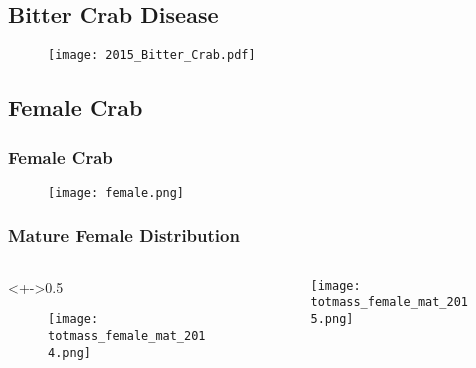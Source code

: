 \subsection{Bitter Crab Disease}

\begin{frame}

\begin{figure}

 \vspace*{-1.8cm}
 \centerline{\texttt{[image: 2015\_Bitter\_Crab.pdf]}}

 \end{figure}
\end{frame}


\subsection{Female Crab}

\begin{frame}

\frametitle{Female Crab}
\begin{figure}

 \vspace*{-0.4cm}
 \centerline{\texttt{[image: female.png]}}

 \end{figure}
\end{frame}




\begin{frame}
\frametitle{Mature Female Distribution}

\begin{columns}
\begin{column}<+->{0.5\textwidth}
 \vspace*{-0.5cm}
\begin{figure}
\centerline{\texttt{[image: totmass\_female\_mat\_2014.png]}}

\end{figure}
\end{column}

\begin{column}{0.5\textwidth}
\begin{figure}
 \vspace*{-0.5cm}

\centerline{\texttt{[image: totmass\_female\_mat\_2015.png]}}

 \end{figure}

\end{column}
\end{columns}


\end{frame}

